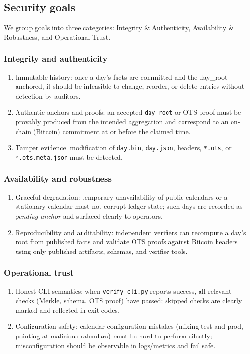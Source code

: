 \subsection{Security goals}
We group goals into three categories: Integrity \& Authenticity, Availability \& Robustness, and Operational Trust.

\subsubsection{Integrity and authenticity}
\begin{enumerate}[nosep]
  \item Immutable history: once a day's facts are committed and the day\_root anchored, it should be infeasible to change, reorder, or delete entries without detection by auditors.
  \item Authentic anchors and proofs: an accepted \texttt{day\_root} or \ac{OTS} proof must be provably produced from the intended aggregation and correspond to an on-chain (Bitcoin) commitment at or before the claimed time.
  \item Tamper evidence: modification of \texttt{day.bin}, \texttt{day.json}, headers, \texttt{*.ots}, or \texttt{*.ots.meta.json} must be detected.
\end{enumerate}

\subsubsection{Availability and robustness}
\begin{enumerate}[nosep]
  \item Graceful degradation: temporary unavailability of public calendars or a stationary calendar must not corrupt ledger state; such days are recorded as \emph{pending anchor} and surfaced clearly to operators.
  \item Reproducibility and auditability: independent verifiers can recompute a day's root from published facts and validate \ac{OTS} proofs against Bitcoin headers using only published artifacts, schemas, and verifier tools.
\end{enumerate}

\subsubsection{Operational trust}
\begin{enumerate}[nosep]
  \item Honest \ac{CLI} semantics: when \texttt{verify\_cli.py} reports success, all relevant checks (Merkle, schema, \ac{OTS} proof) have passed; skipped checks are clearly marked and reflected in exit codes.
  \item Configuration safety: calendar configuration mistakes (mixing test and prod, pointing at malicious calendars) must be hard to perform silently; misconfiguration should be observable in logs/metrics and fail safe.
\end{enumerate}

